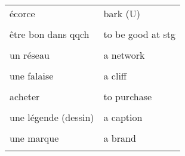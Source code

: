 \documentclass[
  10pt,
]{article}
\begin{document}
\begin{longtable}{ll}
écorce & bark (U)\\

\cellcolor{gray!6}{épaisseur} & \cellcolor{gray!6}{thickness}\\

être bon dans qqch & to be good  at stg\\

\cellcolor{gray!6}{un propriétaire} & \cellcolor{gray!6}{an owner}\\

un réseau & a network\\

\cellcolor{gray!6}{difficile} & \cellcolor{gray!6}{tough}\\

une falaise & a cliff\\

\cellcolor{gray!6}{une vente} & \cellcolor{gray!6}{a sale}\\

acheter & to purchase\\

\cellcolor{gray!6}{améliorer, mettre en valeur} & \cellcolor{gray!6}{to enhance}\\

une légende (dessin) & a caption\\

\cellcolor{gray!6}{jetable} & \cellcolor{gray!6}{disposable}\\

une marque & a brand\\

\cellcolor{gray!6}{un outil} & \cellcolor{gray!6}{a tool}\\
\bottomrule
\end{longtable}

\end{document}
